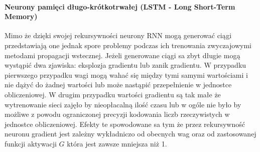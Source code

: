 \paragraph{Neurony pamięci długo-krótkotrwałej (LSTM - Long Short-Term Memory)}
Mimo że dzięki swojej rekursywności neurony RNN mogą generować ciągi przedstawiają one jednak spore problemy podczas ich trenowania zwyczajowymi metodami propagacji wstecznej. Jeżeli generowane ciągi sa zbyt długie mogą wystąpić dwa zjawiska: eksplozja gradientu lub zanik gradientu. W przypadku pierwszego przypadku wagi mogą wahać się między tymi samymi wartościami i nie dążyć do żadnej wartości lub może nastąpić przepełnienie w jednostce obliczeniowej. W drugim przypadku wartości gradientu są tak małe że wytrenowanie sieci zajęło by nieopłacalną ilość czasu lub w ogóle nie było by możliwe z powodu ograniczonej precyzji kodowania liczb rzeczywistych w jednostce obliczeniowej. Efekty te spowodowane sa tym że przez rekursywność neuronu gradient jest zależny wykładniczo od obecnych wag oraz od zastosowanej funkcji aktywacji $G$ która jest zawsze mniejsza niż 1.\cite[p.~18]{LSTM-intro}

